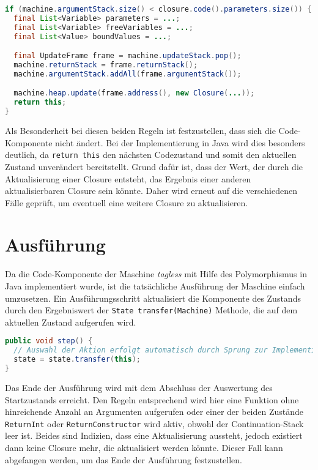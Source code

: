\begin{lstlisting}[language=java, caption={Implementierung der Erkennung von Aktualisierungen bei Funktionen}, label={lst:rule-17}]
if (machine.argumentStack.size() < closure.code().parameters.size()) {
  final List<Variable> parameters = ...;
  final List<Variable> freeVariables = ...;
  final List<Value> boundValues = ...;

  final UpdateFrame frame = machine.updateStack.pop();
  machine.returnStack = frame.returnStack();
  machine.argumentStack.addAll(frame.argumentStack());

  machine.heap.update(frame.address(), new Closure(...));
  return this;
}
\end{lstlisting}


Als Besonderheit bei diesen beiden Regeln ist festzustellen, dass sich die Code-Komponente nicht ändert.
Bei der Implementierung in Java wird dies besonders deutlich, da \texttt{return this} den nächsten Codezustand und somit den aktuellen Zustand unverändert bereitstellt.
Grund dafür ist, dass der Wert, der durch die Aktualisierung einer Closure entsteht, das Ergebnis einer anderen aktualisierbaren Closure sein könnte.
Daher wird erneut auf die verschiedenen Fälle geprüft, um eventuell eine weitere Closure zu aktualisieren.


\section{Ausführung}

Da die Code-Komponente der Maschine \textit{tagless} mit Hilfe des Polymorphismus in Java implementiert wurde, ist die tatsächliche Ausführung der Maschine einfach umzusetzen.
Ein Ausführungsschritt aktualisiert die Komponente des Zustands durch den Ergebniswert der \texttt{State transfer(Machine)} Methode, die auf dem aktuellen Zustand aufgerufen wird.

\begin{lstlisting}[language=java]
public void step() {
  // Auswahl der Aktion erfolgt automatisch durch Sprung zur Implementierung.
  state = state.transfer(this);
}
\end{lstlisting}

Das Ende der Ausführung wird mit dem Abschluss der Auswertung des Startzustands erreicht.
Den Regeln entsprechend wird hier eine Funktion ohne hinreichende Anzahl an Argumenten aufgerufen oder einer der beiden Zustände \texttt{ReturnInt} oder \texttt{ReturnConstructor} wird aktiv, obwohl der Continuation-Stack leer ist.
Beides sind Indizien, dass eine Aktualisierung aussteht, jedoch existiert dann keine Closure mehr, die aktualisiert werden könnte.
Dieser Fall kann abgefangen werden, um das Ende der Ausführung festzustellen.


